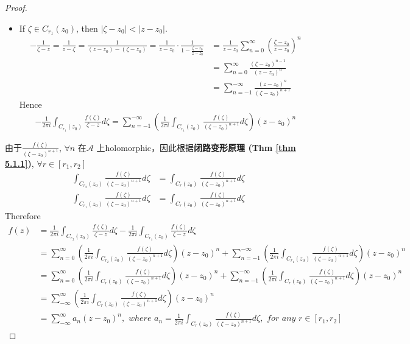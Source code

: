 \begin{thm}
\begin{proof}
\begin{itemize}
				\item If $\zeta \in C_{r_1}(z_0)$, then $\left| \zeta - z_0 \right| < \left| z - z_0 \right|$.
				\begin{align}
					-\frac{1}{\zeta - z} 
					= \frac{1}{z - \zeta}
					= \frac{1}{(z - z_0) - (\zeta - z_0)}
					= \frac{1}{z - z_0} \cdot \frac{1}{1 - \frac{\zeta - z_0}{z - z_0}}
					&= \frac{1}{z - z_0} \sum_{n = 0}^{\infty}{\left( \frac{\zeta - z_0}{z - z_0} \right)^n} \\
					&= \sum_{n = 0}^{\infty}{\frac{(\zeta - z_0)^{n - 1}}{(z - z_0)^n}} \\
					&= \sum_{n = -1}^{-\infty}{\frac{(z - z_0)^n}{(\zeta - z_0)^{n + 1}}}
				\end{align}
				Hence
				\begin{align}
					-\frac{1}{2\pi i} \int_{C_{r_1}(z_0)}{\frac{f(\zeta)}{\zeta - z} d\zeta}
					= \sum_{n = -1}^{-\infty}{\left( \frac{1}{2\pi i} \int_{C_{r_1}(z_0)}{\frac{f(\zeta)}{(\zeta - z_0)^{n + 1}} d\zeta} \right) (z - z_0)^n}
				\end{align}
			\end{itemize}
			由于$\frac{f(\zeta)}{(\zeta - z_0)^{n + 1}}$, $\forall n$ 在$\mathcal{A}$ 上holomorphic，因此根据\textbf{闭路变形原理 (Thm \ref{thm 5.1.1})}, $\forall r \in [r_1 , r_2]$
			\begin{align}
				\int_{C_{r_2}(z_0)}{\frac{f(\zeta)}{(\zeta - z_0)^{n + 1} } d\zeta }
				&= \int_{C_{r}(z_0)}{\frac{f(\zeta)}{(\zeta - z_0)^{n + 1} } d\zeta } \\
				\int_{C_{r_1}(z_0)}{\frac{f(\zeta)}{(\zeta - z_0)^{n + 1} } d\zeta }
				&= \int_{C_{r}(z_0)}{\frac{f(\zeta)}{(\zeta - z_0)^{n + 1} } d\zeta }
			\end{align}
			Therefore
			\begin{align}
				f(z) 
				&= \frac{1}{2 \pi i} \int_{C_{r_2}(z_0)}{\frac{f(\zeta)}{\zeta - z} d\zeta} - \frac{1}{2 \pi i} \int_{C_{r_1}(z_0)}{\frac{f(\zeta)}{\zeta - z} d\zeta} \\
				&= \sum_{n = 0}^{\infty}{\left( \frac{1}{2 \pi i} \int_{C_{r_2}(z_0)}{\frac{f(\zeta)}{(\zeta - z_0)^{n + 1} } d\zeta } \right) (z - z_0)^n} + \sum_{n = -1}^{-\infty}{\left( \frac{1}{2\pi i} \int_{C_{r_1}(z_0)}{\frac{f(\zeta)}{(\zeta - z_0)^{n + 1}} d\zeta} \right) (z - z_0)^n} \\
				&= \sum_{n = 0}^{\infty}{\left( \frac{1}{2 \pi i} \int_{C_{r}(z_0)}{\frac{f(\zeta)}{(\zeta - z_0)^{n + 1} } d\zeta } \right) (z - z_0)^n} + \sum_{n = -1}^{-\infty}{\left( \frac{1}{2\pi i} \int_{C_{r}(z_0)}{\frac{f(\zeta)}{(\zeta - z_0)^{n + 1}} d\zeta} \right) (z - z_0)^n} \\
				&= \sum_{-\infty}^{\infty}{\left( \frac{1}{2 \pi i} \int_{C_{r}(z_0)}{\frac{f(\zeta)}{(\zeta - z_0)^{n + 1} } d\zeta } \right) (z - z_0)^n} \\
				&= \sum_{- \infty}^{\infty}{a_n (z - z_0)^n}, \,\,where \,\, a_n = \frac{1}{2\pi i} \int_{C_{r}(z_0)}{\frac{f(\zeta)}{(\zeta - z_0)^{n + 1}} d\zeta} , \,\, for \,\, any \,\, r \in [r_1 , r_2]
			\end{align}
		\end{proof}
	\end{thm}

